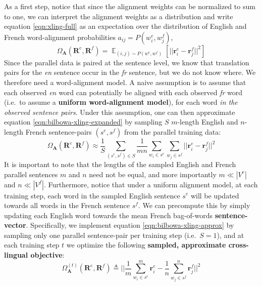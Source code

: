 \documentclass[10pt]{article}
\newcommand\bld[1]{\textbf{#1}}
\newcommand\mat[1]{\mathbf{#1}}
\DeclareMathOperator*{\E}{\mathbb{E}}
\begin{document}
As a first step,
notice that since the alignment weights can be normalized to sum to one, we can interpret the
alignment weights as a distribution and write equation \ref{eqn:xling-full} as an
expectation over the distribution of English and French word-alignment
probabilities $a_{ij} = P(w^e_i, w^f_j)$,
\begin{equation}  \label{eqn:bilbowa-xling-expanded}
  \Omega_\mat{A}(\mat{R}^e, \mat{R}^f) 
   = \E_{(i,j) \sim P(w^e, w^f)} \left [ ||\mat{r}^e_i - \mat{r}^f_j ||^2 \right ]
\end{equation}
Since the parallel data is paired at the sentence level, we know that translation pairs for
the \emph{en} sentence occur in the \emph{fr} sentence, but we do not know
where. We therefore need a word-alignment model. 
A naive assumption is to assume that each observed
\emph{en} word can potentially be aligned with each observed \emph{fr} word (i.e.\
to assume a \bld{uniform word-alignment model}), for each word \emph{in the
observed sentence pairs}.  Under this assumption, one can then approximate
equation \ref{eqn:bilbowa-xling-expanded} by sampling $S$ $m$-length English and
$n$-length French sentence-pairs $(s^{e},s^{f})$ from the parallel training
data: 
\begin{equation} \label{eqn:bilbowa-xling-approx}
  \Omega_\mat{A}(\mat{R}^e, \mat{R}^f) 
    \approx \frac{1}{S} \sum_{(s^{e},s^{f}) \in S} 
       \frac{1}{mn} \sum_{w_i \in s^{e}} \sum_{w_j \in s^{f}} 
         ||\mat{r}^e_i - \mat{r}^f_j ||^2
\end{equation}
It is important to note that the lengths of the sampled English and French parallel 
sentences $m$ and $n$ need not be equal, and more importantly $m \ll |V^e|$ and 
$n \ll |V^f|$. Furthermore, notice that under a uniform alignment model, at each 
training step, each word
in the sampled English sentence $s^e$ will be updated towards all words in the
French sentence $s^f$. We can precompute this by simply updating each English
word towards the mean French bag-of-words \bld{sentence-vector}. Specifically,
we implement equation \ref{eqn:bilbowa-xling-approx} by sampling only one parallel 
sentence-pair per training step (i.e.\ $S=1$), and at each
training step $t$ we optimize the following \bld{sampled, approximate cross-lingual
objective}:
\begin{equation}
    \label{eqn:bilbowa-xling-sentvec}
    \Omega^{(t)}_\mat{A}(\mat{R}^e, \mat{R}^f) \triangleq 
    || \frac{1}{m} \sum_{w_i \in s^e}^m \mat{r}^e_i - 
    \frac{1}{n} \sum_{w_j \in s^f}^n \mat{r}^f_j ||^2
\end{equation}
\end{document}
